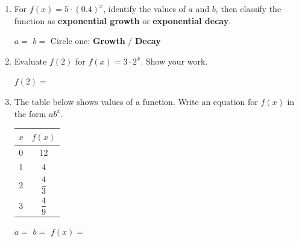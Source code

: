 \documentclass[10pt]{article}
\begin{document}
\namedateperiod

\vspace{0.14in}

\begin{enumerate}[itemsep=16pt]

\item For $f(x) = 5 \cdot (0.4)^x$, identify the values of $a$ and $b$, then classify the
      function as \textbf{exponential growth} or \textbf{exponential decay}.

      \vspace{0.06in}
      $a = $ \blank{2.5cm} \quad $b = $ \blank{2.5cm} \quad Circle one: \textbf{Growth} \;/\; \textbf{Decay}

\item Evaluate $f(2)$ for $f(x) = 3 \cdot 2^x$. Show your work.

      \vspace{0.06in}
      $f(2) = $ \blank{4cm}

\item The table below shows values of a function. Write an equation for $f(x)$ in the form
      $ab^x$.

      \vspace{0.08in}
      \begin{center}
      \renewcommand{\arraystretch}{1.4}
      \begin{tabular}{|c|c|}
        \hline
        $x$ & $f(x)$ \\
        \hline
        0 & 12 \\
        1 & 4 \\
        2 & $\dfrac{4}{3}$ \\
        3 & $\dfrac{4}{9}$ \\
        \hline
      \end{tabular}
      \end{center}

      \vspace{0.06in}
      $a = $ \blank{2cm} \quad $b = $ \blank{2cm} \quad $f(x) = $ \blank{4cm}

\end{enumerate}
\end{document}
